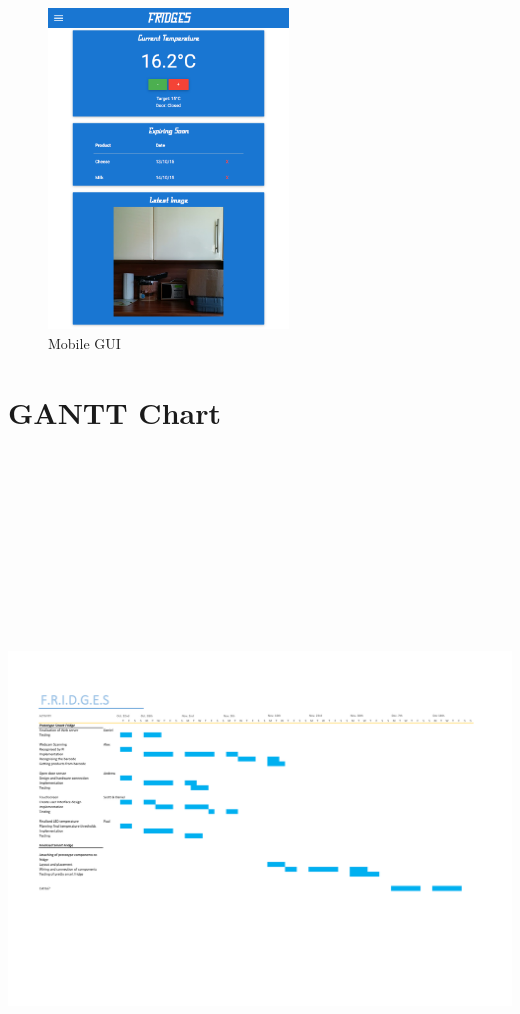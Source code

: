 \documentclass[10pt]{article}
\begin{document}
\begin{figure}[h]
\centering
\caption{Mobile GUI}
\label{Mobile GUI}
\includegraphics[height=8.5cm]{images/Mobile-Screenshot.png}
\end{figure}

\newpage
\section{GANTT Chart}
\includegraphics[height=20cm, width=23cm,angle=90]{GANTT.pdf}
\end{document}
